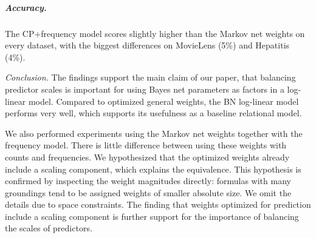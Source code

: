\documentclass{article}
\begin{document}
\subparagraph{Accuracy.} 
The CP+frequency model scores slightly higher than the Markov net weights on every dataset, with the biggest differences on MovieLens (5\%) and Hepatitis (4\%). 

{\em Conclusion.}
The findings support the main claim of our paper, that balancing predictor scales is important for using Bayes net parameters as factors in a log-linear model. Compared to optimized general weights, the BN log-linear model performs very well, which supports its usefulness as a baseline relational model. 


We also performed experiments using the Markov net weights together with the frequency model.
There is little difference between using these weights with counts and frequencies. We hypothesized that the optimized weights already include a scaling component, which explains the equivalence.
This hypothesis is 
confirmed by inspecting the weight magnitudes directly: formulas with many groundings tend to be assigned weights of smaller absolute size. We omit the details due to space constraints. The finding that weights optimized for prediction include a scaling component is further support for the importance of balancing the scales of predictors.



%
%
%


\end{document}
